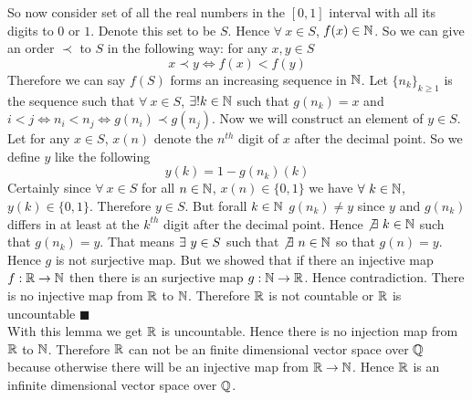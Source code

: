\documentclass[a4paper, 11pt]{article}
\renewenvironment{proof}{\noindent{\it \textbf{Proof:}}\hspace*{1em}}{\hfill $\blacksquare$\bigskip\\}
\begin{document}
{\begin{itemize}
\begin{proof}
So now consider set of all the real numbers in the $[0,1]$ interval with all its digits to $0$ or $1$. Denote this set to be $S$. Hence $\forall\ x\in S$, $f(x)\in \mathbb{N}$. So  we can give an order $\prec$ to $S$ in the following way: for any $x,y\in S$ $$x\prec y\iff f(x)<f(y)$$Therefore we can say $f(S)$ forms an increasing sequence in $\mathbb{N}$. Let $\{n_k\}_{k\geq 1}$ is the sequence such that $\forall\ x\in S$, $\exists! k\in\mathbb{N}$ such that $g(n_k)=x$ and $i<j\iff n_i<n_j\iff g(n_i)\prec g(n_j)$. Now we will construct an element of $y\in S$. Let for any $x\in S$, $x(n)$ denote the $n^{th}$ digit of $x$ after the decimal point. So we define $y$ like the following $$y(k)=1-g(n_k)(k)$$Certainly since $\forall\ x\in S$ for all $n\in \mathbb{N}$, $x(n)\in\{0,1\}$ we have $\forall\ k\in\mathbb{N}$, $y(k)\in\{0,1\}$. Therefore $y\in S$. But forall $k\in \mathbb{N}$ $g(n_k)\neq y$ since $y$ and $g(n_k)$ differs in at least at the $k^{th}$ digit after the decimal point. Hence $\not\exists\ k\in\mathbb{N}$ such that $g(n_k)=y$. That means $\exists\ y\in S$ such that $\not\exists \ n\in\mathbb{N}$ so that $g(n)=y$. Hence $g$ is not surjective map. But we showed that if there an injective map $f:\mathbb{R}\to\mathbb{N}$ then there is an surjective map $g:\mathbb{N}\to \mathbb{R}$. Hence contradiction. There is no injective map from $\mathbb{R}$ to $\mathbb{N}$. Therefore $\mathbb{R}$ is not countable or $\mathbb{R} $ is uncountable
\end{proof}
With this lemma we get $\mathbb{R}$ is uncountable. Hence there is no injection map from $\mathbb{R}$ to $\mathbb{N}$. Therefore $\mathbb{R}$ can not be an finite dimensional vector space over $\mathbb{Q}$ because otherwise there will be an injective map from $\mathbb{R}\to \mathbb{N}$. Hence $\mathbb{R}$ is an infinite dimensional vector space over $\mathbb{Q}$.
	\end{itemize}

}
\end{document}
